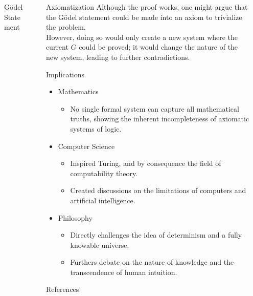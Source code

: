 \documentclass[final]{beamer} %
\newlength{\sepwidth}
\newlength{\colwidth}
\newcommand{\separatorcolumn}{\begin{column}{\sepwidth}\end{column}}
\begin{document}
\begin{frame}[t]
\begin{columns}[t]
\begin{column}{\colwidth}
\begin{block}{Gödel Statement}
 \end{block}

\end{column}


\separatorcolumn

\begin{column}{\colwidth}

\begin{block}{Axiomatization}
Although the proof works, one might argue that the Gödel statement could be made into an axiom to trivialize the problem.\\
However, doing so would only create a new system where the current $G$ could be proved; it would change the nature of the new system, leading to further contradictions.

\end{block}

\begin{block}{Implications}

 \begin{itemize}
      \item Mathematics
        \begin{itemize}
            \item No single formal system can capture all mathematical truths, showing the inherent incompleteness of axiomatic systems of logic.
        \end{itemize}
      
      \item Computer Science
        \begin{itemize}
            \item Inspired Turing, and by consequence the field of computability theory.
            \item Created discussions on the limitations of computers and artificial intelligence.
        \end{itemize}
      
      \item Philosophy
        \begin{itemize}
            \item Directly challenges the idea of determinism and a fully knowable universe.
            \item Furthers debate on the nature of knowledge and the transcendence of human intuition.
        \end{itemize}
        
    \end{itemize}
    
\end{block}

  \begin{block}{References}

    \nocite{*}
    \footnotesize{}

  \end{block}

\end{column}

\separatorcolumn
\end{columns}
\end{frame}
\end{document}
